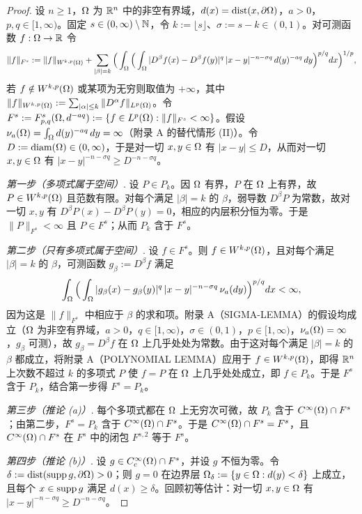 \begin{proof}
设 $n\ge1$，$\Omega$ 为 $\mathbb{R}^n$ 中的非空有界域，$d(x)=\operatorname{dist}(x,\partial\Omega)$，$a>0$，$p,q\in[1,\infty)$。固定 $s\in(0,\infty)\setminus\mathbb{N}$，令 $k:=\lfloor s\rfloor$、$\sigma:=s-k\in(0,1)$。对可测函数 $f:\Omega\to\mathbb{R}$ 令
\[
  \|f\|_{F^s}:=\|f\|_{W^{k,p}(\Omega)}
  +\sum_{|\beta|=k}\Big(\int_\Omega\Big(\int_\Omega |D^\beta f(x)-D^\beta f(y)|^q\,|x-y|^{-n-\sigma q}\,d(y)^{-aq}\,dy\Big)^{p/q}dx\Big)^{1/p},
\]
若 $f\notin W^{k,p}(\Omega)$ 或某项为无穷则取值为 $+\infty$，其中 $\|f\|_{W^{k,p}(\Omega)}:=\sum_{|\alpha|\le k}\|D^\alpha f\|_{L^p(\Omega)}$。令 $F^s:=F^{s}_{p,q}(\Omega,d^{-aq}):=\{f\in L^p(\Omega) : \|f\|_{F^s}<\infty\}$。假设 $\nu_{a}(\Omega)=\int_\Omega d(y)^{-aq}\,dy=\infty$（附录 A 的替代情形 (II)）。令 $D:=\operatorname{diam}(\Omega)\in(0,\infty)$，于是对一切 $x,y\in\Omega$ 有 $|x-y|\le D$，从而对一切 $x,y\in\Omega$ 有 $|x-y|^{-n-\sigma q}\ge D^{-n-\sigma q}$。

\emph{第一步（多项式属于空间）}. 设 $P\in P_k$。因 $\Omega$ 有界，$P$ 在 $\Omega$ 上有界，故 $P\in W^{k,p}(\Omega)$ 且范数有限。对每个满足 $|\beta|=k$ 的 $\beta$，弱导数 $D^\beta P$ 为常数，故对一切 $x,y$ 有 $D^\beta P(x)-D^\beta P(y)=0$，相应的内层积分恒为零。于是 $\|P\|_{F^s}<\infty$ 且 $P\in F^s$；从而 $P_k$ 含于 $F^s$。

\emph{第二步（只有多项式属于空间）}. 设 $f\in F^s$。则 $f\in W^{k,p}(\Omega)$，且对每个满足 $|\beta|=k$ 的 $\beta$，可测函数 $g_\beta:=D^\beta f$ 满足
\[
  \int_\Omega\Big(\int_\Omega |g_\beta(x)-g_\beta(y)|^q\,|x-y|^{-n-\sigma q}\,\nu_{a}(dy)\Big)^{p/q}dx<\infty ,
\]
因为这是 $\|f\|_{F^s}$ 中相应于 $\beta$ 的求和项。附录 A（SIGMA-LEMMA）的假设均成立（$\Omega$ 为非空有界域，$a>0$，$q\in[1,\infty)$，$\sigma\in(0,1)$，$p\in[1,\infty)$，$\nu_{a}(\Omega)=\infty$，$g_\beta$ 可测），故 $g_\beta=D^\beta f$ 在 $\Omega$ 上几乎处处为常数。由于这对每个满足 $|\beta|=k$ 的 $\beta$ 都成立，将附录 A（POLYNOMIAL LEMMA）应用于 $f\in W^{k,p}(\Omega)$，即得 $\mathbb{R}^n$ 上次数不超过 $k$ 的多项式 $P$ 使 $f=P$ 在 $\Omega$ 上几乎处处成立，即 $f\in P_k$。于是 $F^s$ 含于 $P_k$，结合第一步得 $F^s=P_k$。

\emph{第三步（推论 (a)）}. 每个多项式都在 $\Omega$ 上无穷次可微，故 $P_k$ 含于 $C^\infty(\Omega)\cap F^s$；由第二步，$F^s=P_k$ 含于 $C^\infty(\Omega)\cap F^s$。于是 $C^\infty(\Omega)\cap F^s=F^s$，且 $C^\infty(\Omega)\cap F^s$ 在 $F^s$ 中的闭包 $F^{s,2}$ 等于 $F^s$。

\emph{第四步（推论 (b)）}. 设 $g\in C_c^\infty(\Omega)\cap F^s$，并设 $g$ 不恒为零。令 $\delta:=\operatorname{dist}(\operatorname{supp} g,\partial\Omega)>0$；则 $g=0$ 在边界层 $\Omega_\delta:=\{y\in\Omega : d(y)<\delta\}$ 上成立，且每个 $x\in\operatorname{supp} g$ 满足 $d(x)\ge\delta$。回顾初等估计：对一切 $x,y\in\Omega$ 有 $|x-y|^{-n-\sigma q}\ge D^{-n-\sigma q}$。


\end{proof}
